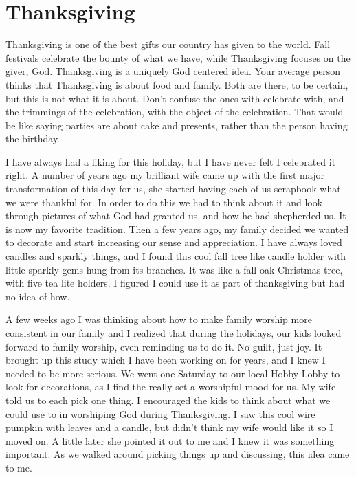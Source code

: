 \chapter{Thanksgiving}

Thanksgiving is one of the best gifts our country has given to the world.  Fall festivals celebrate the bounty of what we have, while Thanksgiving focuses on the giver, God.  Thanksgiving is a uniquely God centered idea.  Your average person thinks that Thanksgiving is about food and family.  Both are there, to be certain, but this is not what it is about.  Don't confuse the ones with celebrate with, and the trimmings of the celebration, with the object of the celebration.  That would be like saying parties are about cake and presents, rather than the person having the birthday.

I have always had a liking for this holiday, but I have never felt I celebrated it right.  A number of years ago my brilliant wife came up with the first major transformation of this day for us, she started having each of us scrapbook what we were thankful for. In order to do this we had to think about it and look through pictures of what God had granted us, and how he had shepherded us.  It is now my favorite tradition.  Then a few years ago, my family decided we wanted to decorate and start increasing our sense and appreciation.  I have always loved candles and sparkly things, and I found this cool fall tree like candle holder with little sparkly gems hung from its branches.  It was like a fall oak Christmas tree, with five tea lite holders.  I figured I could use it as part of thanksgiving but had no idea of how.

A few weeks ago I was thinking about how to make family worship more consistent in our family and I realized that during the holidays, our kids looked forward to family worship, even reminding us to do it.  No guilt, just joy.  It brought up this study which I have been working on for years, and I knew I needed to be more serious.  We went one Saturday to our local Hobby Lobby to look for decorations, as I find the really set a worshipful mood for us.  My wife told us to each pick one thing.  I encouraged the kids to think about what we could use to in worshiping God during Thanksgiving.  I saw this cool wire pumpkin with leaves and a candle, but didn't think my wife would like it so I moved on.  A little later she pointed it out to me and I knew it was something important.  As we walked around picking things up and discussing, this idea came to me.

